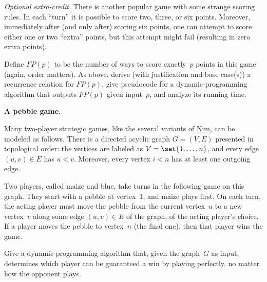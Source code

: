\documentclass[11pt,addpoints]{exam}
\begin{document}
\begin{questions}
\begin{parts}
    \begin{solution}

    \end{solution}

    \bonuspart[3] \emph{Optional extra-credit.}
    There is another popular game with some strange scoring rules.
    In each ``turn'' it is possible to score two, three, or six points.
    Moreover, immediately after (and only after) scoring six points, one can attempt to score either one or two ``extra'' points, but this attempt might fail (resulting in zero extra points).

    Define $FP(p)$ to be the number of ways to score exactly~$p$ points in this game (again, order matters).
    As above, derive (with justification and base case(s)) a recurrence relation for $FP(p)$, give pseudocode for a dynamic-programming algorithm that outputs $FP(p)$ given input~$p$, and analyze its running time.
    \begin{solution}

    \end{solution}

  \end{parts}

  \question \textbf{A pebble game.}
    
  Many two-player strategic games, like the several variants of \href{https://en.wikipedia.org/wiki/Nim}{Nim}, can be modeled as follows.
  There is a directed acyclic graph $G=(V,E)$ presented in topological order: the vertices are labeled as $V=\set{1, \ldots, n}$, and every edge $(u,v) \in E$ has $u < v$.
  Moreover, every vertex $i < n$ has at least one outgoing edge.
    
  Two players, called maize and blue, take turns in the following game on this graph.
  They start with a pebble at vertex~1, and maize plays first.
  On each turn, the acting player must move the pebble from the current vertex~$u$ to a new vertex~$v$ along some edge $(u,v) \in E$ of the graph, of the acting player's choice.
  If a player moves the pebble to vertex~$n$ (the final one), then that player wins the game.

  Give a dynamic-programming algorithm that, given the graph~$G$ as input, determines which player can be guaranteed a win by playing perfectly, no matter how the opponent plays.
    
\end{questions}
\end{document}
